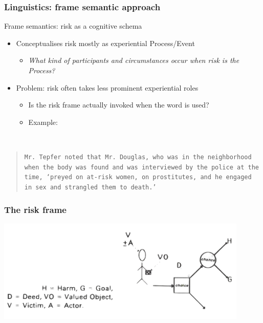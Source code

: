 \documentclass{beamer}       %
\begin{document}
\begin{frame}
    \frametitle{Linguistics: frame semantic approach}

    Frame semantics: risk as a cognitive schema \cite{fillmore_toward_1992}

\begin{itemize}
    \item Conceptualises risk mostly as experiential Process\slash Event
    \begin{itemize}
        \item \emph{What kind of participants and circumstances occur when risk is the Process?}
    \end{itemize}
    \item Problem: risk often takes less prominent experiential roles
    \begin{itemize}
        \item Is the risk frame actually invoked when the word is used?
        \item Example:
    \end{itemize}
    \end{itemize}

    ~\\
    \footnotesize
    \begin{quote}
    \noindent
    \texttt{Mr. Tepfer noted that Mr. Douglas, who was in the neighborhood when the body was found and was interviewed by the police at the time, `preyed on \textbf{at-risk women}, on prostitutes, and he engaged in sex and strangled them to death.' }
    \end{quote}

\end{frame}

\begin{frame}
    \frametitle{The risk frame}
    \centering
    \includegraphics[width=0.90\textwidth]{../../images/riskframe.png}
\end{frame}
\end{document}
